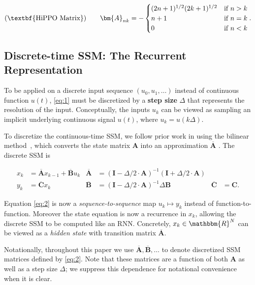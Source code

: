 \begin{equation}
  \label{eq:hippo}
  (\text{\textbf{HiPPO Matrix}})
  \qquad
  \bm{A}_{nk}
  =
  -
  \begin{cases}
    (2n+1)^{1/2}(2k+1)^{1/2} & \mbox{if } n > k \\
    n+1 & \mbox{if } n = k \\
    0 & \mbox{if } n < k
  \end{cases}
  .
\end{equation}

\subsection{Discrete-time SSM: The Recurrent Representation}
\label{sec:ss-recurrent}

To be applied on a discrete input sequence \( (u_0, u_1, \dots) \) instead of continuous function \( u(t) \),
\eqref{eq:1} must be discretized by a \textbf{step size} \( \Delta \) that represents the resolution of the input. Conceptually, the inputs \( u_k \) can be viewed as sampling an implicit underlying continuous signal \( u(t) \), where \( u_k = u(k \Delta) \).

To discretize the continuous-time SSM, we follow prior work in using the bilinear method~\citep{tustin1947method}, which converts the state matrix \( \bm{A} \) into an approximation \( \bm{\overline{A}} \) . The discrete SSM is

\begin{equation}
  \label{eq:2}
\begin{aligned}
  x_{k} &= \bm{\overline{A}} x_{k-1} + \bm{\overline{B}} u_k &
  \bm{\overline{A}} &= (\bm{I} - \Delta/2 \cdot \bm{A})^{-1}(\bm{I} + \Delta/2 \cdot \bm{A}) &
  \\
  y_k &= \bm{\overline{C}} x_k &
  \bm{\overline{B}} &= (\bm{I} - \Delta/2 \cdot \bm{A})^{-1} \Delta \bm{B} &
  \bm{\overline{C}} &= \bm{C}
  .
\end{aligned}
\end{equation}

Equation \eqref{eq:2} is now a \emph{sequence-to-sequence} map \( u_k \mapsto y_k \) instead of function-to-function. Moreover the state equation is now a recurrence in \( x_k \),
allowing the discrete SSM to be computed like an RNN. Concretely, \( x_k \in \mathbbm{R}^N \) can be viewed as a \emph{hidden state} with transition matrix \( \bm{\overline{A}} \).

Notationally, throughout this paper we use \( \bm{\overline{A}}, \bm{\overline{B}}, \dots \) to denote discretized SSM matrices defined by \eqref{eq:2}. 
Note that these matrices are a function of both \( \bm{A} \) as well as a step size \( \Delta \); we suppress this dependence for notational convenience when it is clear.

